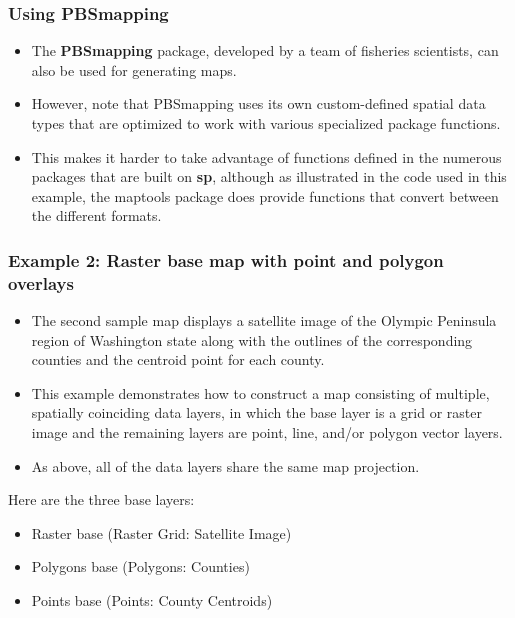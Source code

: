\documentclass{beamer}
\begin{document}
\begin{frame}
\frametitle{Using PBSmapping}
\begin{itemize}

\item The \textbf{PBSmapping }package, developed by a team of fisheries scientists, can also be used for generating maps. \item  However, note that PBSmapping uses its own custom-defined spatial data types that are optimized to work with various specialized package functions. 
\end{itemize}
\end{frame}
\begin{frame}
\begin{itemize}
\item This makes it harder to take advantage of functions defined in the numerous packages that are built on \textbf{sp}, although as illustrated in the code used in this example, the maptools package does provide functions that convert between the different formats.
\end{itemize}
\end{frame}
\begin{frame}
\frametitle{Example 2: Raster base map with point and polygon overlays}
\begin{itemize}
\item The second sample map displays a satellite image of the Olympic Peninsula region of Washington state along with the outlines of the corresponding counties and the centroid point for each county.
\item  This example demonstrates how to construct a map consisting of multiple, spatially coinciding data layers, in which the base layer is a grid or raster image and the remaining layers are point, line, and/or polygon vector layers.
\item  As above, all of the data layers share the same map projection.
\end{itemize}
\end{frame}
\begin{frame}
Here are the three base layers:
\begin{itemize}
\item Raster base (Raster Grid: Satellite Image)	
\item Polygons base	(Polygons: Counties)
\item Points base (Points: County Centroids)
\end{itemize}
\end{frame}
\end{document}
